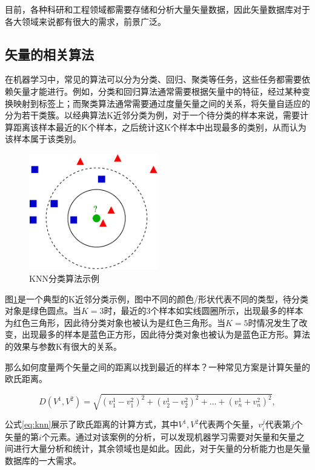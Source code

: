目前，各种科研和工程领域都需要存储和分析大量矢量数据，因此矢量数据库对于各大领域来说都有很大的需求，前景广泛。

\subsection{矢量的相关算法}

在机器学习中，常见的算法可以分为分类、回归、聚类等任务，这些任务都需要依赖矢量才能进行。例如，分类和回归算法通常需要根据矢量中的特征，经过某种变换映射到标签上；而聚类算法通常需要通过度量矢量之间的关系，将矢量自适应的分为若干类簇。以经典算法K近邻分类\cite{keller1985fuzzy}为例，对于一个待分类的样本来说，需要计算距离该样本最近的K个样本，之后统计这K个样本中出现最多的类别，从而认为该样本属于该类别。

\begin{figure}
    \includegraphics[width=0.5\textwidth]{examples/knn.pdf}
    \centering
    \caption{KNN分类算法示例}
    \label{fig:knn}
\end{figure}

图\ref{fig:knn}是一个典型的K近邻分类示例，图中不同的颜色/形状代表不同的类型，待分类对象是绿色圆点。当$K=3$时，最近的3个样本如实线圆圈所示，出现最多的样本为红色三角形，因此待分类对象也被认为是红色三角形。当$K=5$时情况发生了改变，出现最多的样本是蓝色正方形，因此待分类对象也被认为是蓝色正方形。算法的效果与参数K有很大的关系。

那么如何度量两个矢量之间的距离以找到最近的样本？一种常见方案是计算矢量的欧氏距离。

\begin{equation}
    D(V^1,V^2)=\sqrt{(v_1^1-v_1^2)^2+(v_2^1-v_2^2)^2+\dots+(v_n^1+v_n^2)^2},
    \label{eq:knn}
\end{equation}

公式\ref{eq:knn}展示了欧氏距离的计算方式，其中$V^1,V^2$代表两个矢量，$v_i^j$代表第$j$个矢量的第$i$个元素。通过对该案例的分析，可以发现机器学习需要对矢量和矢量之间进行大量分析和统计，其余领域也是如此。因此，对于矢量的分析能力也是矢量数据库的一大需求。
